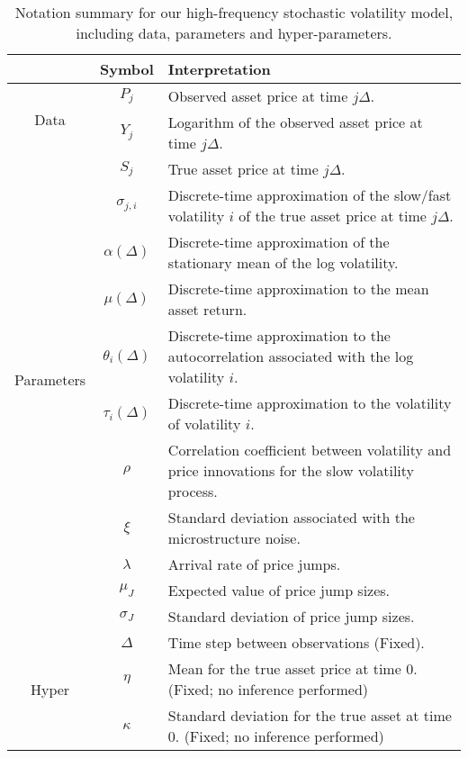 \begin{table}[h!]
\begin{center}
\begin{tabular}{c|c|p{10cm}}
&  Symbol   &   Interpretation  \\ \hline \hline
\multirow{2}{*}{\begin{sideways} Data \end{sideways}} &  $P_j$   &   Observed asset price at time $j\Delta$.  \\
&  $Y_j$   &   Logarithm of the observed asset price at time $j\Delta$.  \\ \hline
\multirow{10}{*}{\begin{sideways} Parameters \end{sideways}} &  $S_j$   &   True asset price at time $j\Delta$.  \\
&  $\sigma_{j,i}$   &   Discrete-time approximation of the slow/fast volatility $i$ of the true asset price at time $j\Delta$.  \\
&  $\alpha(\Delta)$   &   Discrete-time approximation of the stationary mean of the log volatility.  \\
&  $\mu(\Delta)$   &  Discrete-time approximation to the mean asset return.  \\
&  $\theta_i(\Delta)$   &  Discrete-time approximation to the autocorrelation associated with the log volatility $i$.  \\
&  $\tau_i(\Delta)$   &  Discrete-time approximation to the volatility of volatility $i$.  \\
&  $\rho$   &  Correlation coefficient between volatility and price innovations for the slow volatility process.  \\
  &  $\xi$     &   Standard deviation associated with the microstructure noise.  \\
  & $\lambda$ & Arrival rate of price jumps. \\
  & $\mu_J$ & Expected value of price jump sizes. \\
  & $\sigma_J$ & Standard deviation of price jump sizes. \\ \hline
\multirow{4}{*}{\begin{sideways} Hyper \end{sideways}} &  $\Delta$   &  Time step between observations (Fixed).  \\
&  $\eta$   &  Mean for the true asset price at time 0. (Fixed; no inference performed)  \\
&  $\kappa$   &  Standard deviation for the true asset at time 0. (Fixed; no inference performed) \\
\end{tabular}
\caption{Notation summary for our high-frequency stochastic volatility model, including data, parameters and hyper-parameters.}\label{ta:parameters}
\end{center}
\end{table}

